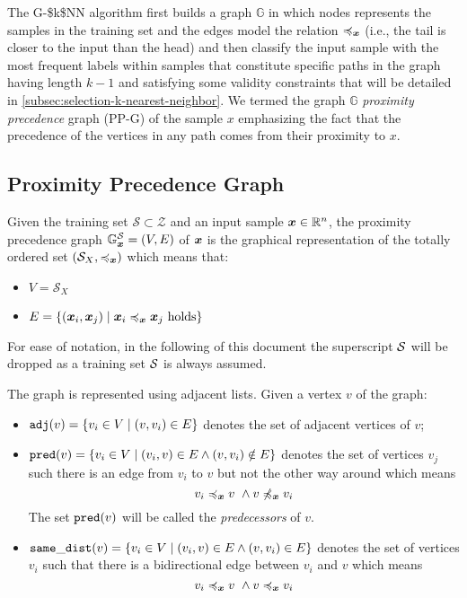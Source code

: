The \acs{G-$k$NN} algorithm first builds a graph $\mathbb{G}$ in which nodes represents the samples in the training set and the edges model the relation $\pre{}{}$ (i.e., the tail is closer to the input than the head) and then classify the input sample with the most frequent labels within samples that constitute specific paths in the graph having length $k-1$ and satisfying some validity constraints that will be detailed in \autoref{subsec:selection-k-nearest-neighbor}. We termed the graph $\mathbb{G}$ \emph{proximity precedence} graph (\acs{PP-G}) of the sample $x$ emphasizing the fact that the precedence of the vertices in any path comes from their proximity to $x$.

\subsection{Proximity Precedence Graph}
\label{subsec:proximity-precedence-graph}

\begin{definition}
  \label{def:pp-g}
  Given the training set $\mathcal{S} \subset \mathcal{Z}$ and an input sample $\vinput \in \mathbb{R}^n$, the proximity precedence graph $\mathbb{G}^{\set}_{\vinput} = (V, E)$ of $\vinput$ is the graphical representation of the totally ordered set $(\mathcal{S}_X, \pre{}{})$ which means that:
\begin{itemize}
  \item $V = \mathcal{S}_X$
  \item $E = \{ (\x[i], \x[j]) \mid \pre{\x[i]}{\x[j]}\ \text{holds} \}$
\end{itemize}
\noindent For ease of notation, in the following of this document the superscript $\set$ will be dropped as a training set $\set$ is always assumed.
\end{definition}

\noindent The graph is represented using adjacent lists. Given a vertex $v$ of the graph:
\begin{itemize}
  \item $\adj{v} = \{v_i \in V \mid (v, v_i) \in E\}$ denotes the set of adjacent vertices of $v$;
  \item $\pred{v} = \{v_i \in V \mid (v_i, v) \in E \wedge (v, v_i) \notin  E \}$ denotes the set of vertices $v_j$ such there is an edge from $v_i$ to $v$ but not the other way around which means
  \[
      \pre{v_i}{v}\ \wedge \npre{v}{v_i}
  \]
  The set $\pred{v}$ will be called the \emph{predecessors} of $v$.
  \item $\samedist{v} = \{v_i \in V \mid (v_i, v) \in E \wedge (v, v_i) \in  E \}$ denotes the set of vertices $v_i$ such that there is a bidirectional edge between $v_i$ and $v$ which means
  \[
      \pre{v_i}{v}\ \wedge \pre{v}{v_i}
  \]
\end{itemize}

